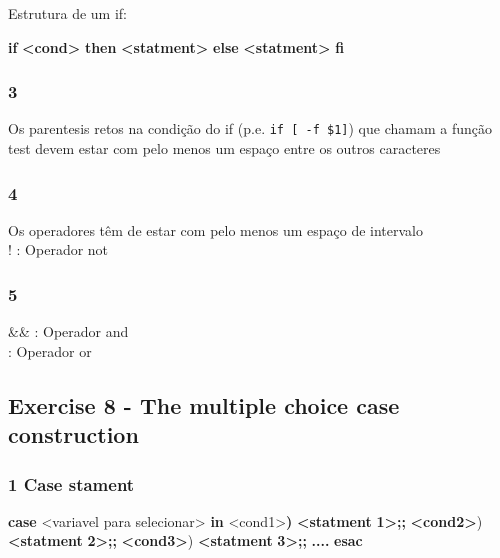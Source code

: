 \documentclass[]{article}
\newenvironment{Shaded}{}{}
\newcommand{\KeywordTok}[1]{\textcolor[rgb]{0.00,0.44,0.13}{\textbf{{#1}}}}
\newcommand{\NormalTok}[1]{{#1}}
\begin{document}
Estrutura de um if:

\begin{Shaded}
\begin{Highlighting}[]
\KeywordTok{if} \KeywordTok{<cond>}
\KeywordTok{then}
    \KeywordTok{<statment>}
\KeywordTok{else}
    \KeywordTok{<statment>}
\KeywordTok{fi}
\end{Highlighting}
\end{Shaded}

\subsubsection{3}\label{section-15}

Os parentesis retos na condição do if (p.e. \texttt{if {[} -f \$1{]}})
que chamam a função test devem estar com pelo menos um espaço entre os
outros caracteres

\subsubsection{4}\label{section-16}

Os operadores têm de estar com pelo menos um espaço de intervalo\\! :
Operador not

\subsubsection{5}\label{section-17}

\&\& : Operador and\\\texttt{\textbar{}\textbar{}} : Operador or\\

\subsection{Exercise 8 - The multiple choice case
construction}\label{exercise-8---the-multiple-choice-case-construction}

\subsubsection{1 Case stament}\label{case-stament}

\begin{Shaded}
\begin{Highlighting}[]
\KeywordTok{case} \NormalTok{<variavel para selecionar>}\KeywordTok{ in}
    \NormalTok{<cond1>}\KeywordTok{)} \KeywordTok{<statment} \KeywordTok{1>;;}
    \KeywordTok{<cond2>}\NormalTok{) }\KeywordTok{<statment} \KeywordTok{2>;;}
    \KeywordTok{<cond3>}\NormalTok{) }\KeywordTok{<statment} \KeywordTok{3>;;}
    \KeywordTok{....}
\KeywordTok{esac}
\end{Highlighting}
\end{Shaded}
\end{document}
